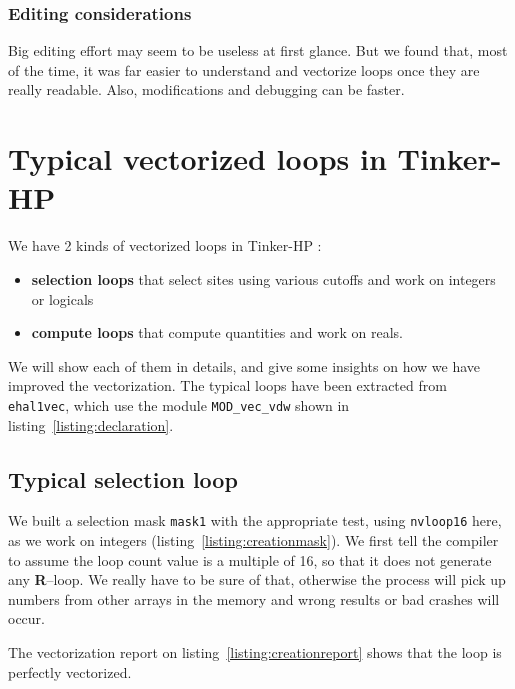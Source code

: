 \documentclass[9pt,comparison]{livecoms}
\newcommand{\lv}{\Large\verb}
\begin{document}
\subsubsection{Editing considerations}
\hspace{\parindent}Big editing effort may seem to be useless at first glance. But we found that, most of the time, it was far easier to understand and vectorize loops once they are really readable. Also, modifications and debugging can be faster.

\section{Typical vectorized loops in Tinker-HP}
\hspace{\parindent}We have 2 kinds of vectorized loops in Tinker-HP :
\begin{itemize}
    \item \textbf{selection loops}
that select sites using various cutoffs and work on integers or logicals \item\textbf{compute loops} that compute quantities and work on reals. \end{itemize}

We will show each of them in details, and give some insights on how we have improved the vectorization. The typical loops have been extracted from {\color{codepurple}\lv|ehal1vec|}, which use the module {\color{codepurple}\lv|MOD_vec_vdw|} shown in listing~\ref{listing:declaration}.
\subsection{Typical selection loop}

\hspace{\parindent}We built a selection mask {\color{blue}\lv|mask1|} with the appropriate test, using {\color{blue}\lv|nvloop16|} here, as we work on integers (listing~\ref{listing:creationmask}). 
We first tell the compiler to assume the loop count value is a multiple of 16, so that it does not generate any \textbf{R}--loop. We really have to be sure of that, otherwise the process will pick up numbers from other arrays in the memory and wrong results or bad crashes will occur. 



 The vectorization report on listing~\ref{listing:creationreport} shows that the loop is perfectly vectorized.
\end{document}
